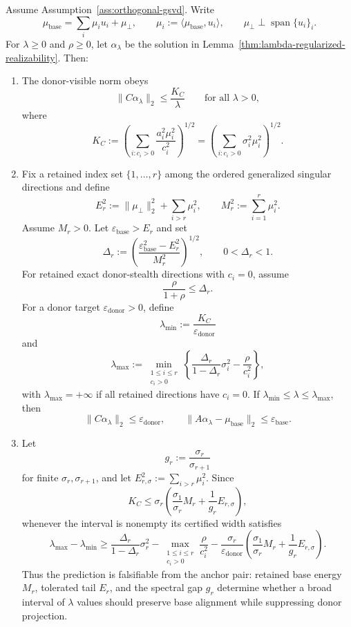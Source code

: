 \begin{theorem}
\label{thm:wide-lambda-window}
Assume Assumption~\ref{ass:orthogonal-gsvd}. Write
\[
\mu_{\text{base}}=\sum_i \mu_i u_i+\mu_\perp,
\qquad
\mu_i:=\langle \mu_{\text{base}},u_i\rangle,
\qquad
\mu_\perp\perp\operatorname{span}\{u_i\}_i.
\]
For $\lambda\ge 0$ and $\rho\ge 0$, let $\alpha_\lambda$ be the solution in Lemma~\ref{thm:lambda-regularized-realizability}. Then:
\begin{enumerate}[leftmargin=*]
\item The donor-visible norm obeys
\[
\|C\alpha_\lambda\|_2
\le
\frac{K_C}{\lambda}
\qquad
\text{for all }\lambda>0,
\]
where
\[
K_C:=\left(\sum_{i:c_i>0}\frac{a_i^2\mu_i^2}{c_i^2}\right)^{1/2}
=
\left(\sum_{i:c_i>0}\sigma_i^2\mu_i^2\right)^{1/2}.
\]
\item Fix a retained index set $\{1,\ldots,r\}$ among the ordered generalized singular directions and define
\[
E_r^2:=\|\mu_\perp\|_2^2+
\sum_{i>r}\mu_i^2,
\qquad
M_r^2:=\sum_{i=1}^{r}\mu_i^2.
\]
Assume $M_r>0$. Let $\varepsilon_{\text{base}}>E_r$ and set
\[
\Delta_r:=\left(\frac{\varepsilon_{\text{base}}^2-E_r^2}{M_r^2}\right)^{1/2},
\qquad
0<\Delta_r<1.
\]
For retained exact donor-stealth directions with $c_i=0$, assume
\[
\frac{\rho}{1+\rho}\le \Delta_r.
\]
For a donor target $\varepsilon_{\text{donor}}>0$, define
\[
\lambda_{\min}:=\frac{K_C}{\varepsilon_{\text{donor}}}
\]
and
\[
\lambda_{\max}:=
\min_{\substack{1\le i\le r\\ c_i>0}}
\left\{
\frac{\Delta_r}{1-\Delta_r}\sigma_i^2-\frac{\rho}{c_i^2}
\right\},
\]
with $\lambda_{\max}=+\infty$ if all retained directions have $c_i=0$. If $\lambda_{\min}\le \lambda\le \lambda_{\max}$, then
\[
\|C\alpha_\lambda\|_2\le \varepsilon_{\text{donor}},
\qquad
\|A\alpha_\lambda-\mu_{\text{base}}\|_2\le \varepsilon_{\text{base}}.
\]
\item Let
\[
g_r:=\frac{\sigma_r}{\sigma_{r+1}}
\]
for finite $\sigma_r,\sigma_{r+1}$, and let $E_{r,\sigma}^2:=\sum_{i>r}\mu_i^2$. Since
\[
K_C
\le
\sigma_r\left(\frac{\sigma_1}{\sigma_r}M_r+\frac{1}{g_r}E_{r,\sigma}\right),
\]
whenever the interval is nonempty its certified width satisfies
\[
\lambda_{\max}-\lambda_{\min}
\ge
\frac{\Delta_r}{1-\Delta_r}\sigma_r^2
-
\max_{\substack{1\le i\le r\\ c_i>0}}\frac{\rho}{c_i^2}
-
\frac{\sigma_r}{\varepsilon_{\text{donor}}}
\left(\frac{\sigma_1}{\sigma_r}M_r+\frac{1}{g_r}E_{r,\sigma}\right).
\]
Thus the prediction is falsifiable from the anchor pair: retained base energy $M_r$, tolerated tail $E_r$, and the spectral gap $g_r$ determine whether a broad interval of $\lambda$ values should preserve base alignment while suppressing donor projection.
\end{enumerate}
\end{theorem}

